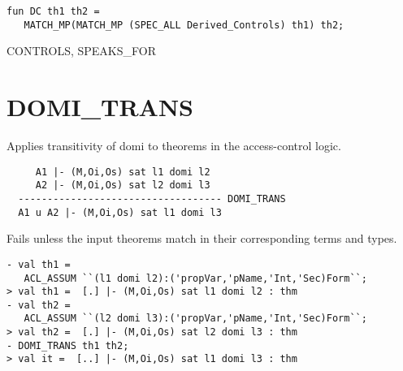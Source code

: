 \IMPLEMENTATION
\begin{holboxed}
\begin{verbatim}
fun DC th1 th2 = 
   MATCH_MP(MATCH_MP (SPEC_ALL Derived_Controls) th1) th2;
\end{verbatim}
\end{holboxed}

\SEEALSO
CONTROLS, SPEAKS_FOR
\ENDDOC

\section{DOMI\_TRANS}



\egroup

\SYNOPSIS
Applies transitivity of domi to theorems in the access-control logic.

\DESCRIBE

\begin{verbatim}
     A1 |- (M,Oi,Os) sat l1 domi l2
     A2 |- (M,Oi,Os) sat l2 domi l3
  ----------------------------------- DOMI_TRANS
  A1 u A2 |- (M,Oi,Os) sat l1 domi l3
\end{verbatim}


\FAILURE 

Fails unless the input theorems match in their corresponding
terms and types.

\EXAMPLE
\begin{holboxed}
\begin{verbatim}
- val th1 = 
   ACL_ASSUM ``(l1 domi l2):('propVar,'pName,'Int,'Sec)Form``;
> val th1 =  [.] |- (M,Oi,Os) sat l1 domi l2 : thm
- val th2 = 
   ACL_ASSUM ``(l2 domi l3):('propVar,'pName,'Int,'Sec)Form``;
> val th2 =  [.] |- (M,Oi,Os) sat l2 domi l3 : thm
- DOMI_TRANS th1 th2;
> val it =  [..] |- (M,Oi,Os) sat l1 domi l3 : thm
\end{verbatim}
\end{holboxed}


